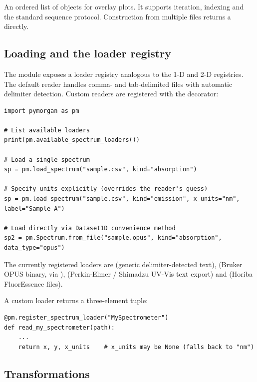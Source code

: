\subsubsection{}

An ordered list of  objects for overlay plots. It supports
iteration, indexing and the standard sequence protocol. Construction from
multiple files returns a  directly.

\subsection{Loading and the loader registry}

The module exposes a loader registry analogous to the 1-D and 2-D registries.
The default  reader handles comma- and tab-delimited files with
automatic delimiter detection. Custom readers are registered with the
 decorator:\

\begin{lstlisting}
import pymorgan as pm

# List available loaders
print(pm.available_spectrum_loaders())

# Load a single spectrum
sp = pm.load_spectrum("sample.csv", kind="absorption")

# Specify units explicitly (overrides the reader's guess)
sp = pm.load_spectrum("sample.csv", kind="emission", x_units="nm", label="Sample A")

# Load directly via Dataset1D convenience method
sp2 = pm.Spectrum.from_file("sample.opus", kind="absorption", data_type="opus")
\end{lstlisting}

The currently registered loaders are  (generic delimiter-detected
text),  (Bruker OPUS binary, via ), 
(Perkin-Elmer / Shimadzu UV-Vis text export) and  (Horiba
FluorEssence  files).

A custom loader returns a three-element tuple:
\begin{lstlisting}
@pm.register_spectrum_loader("MySpectrometer")
def read_my_spectrometer(path):
    ...
    return x, y, x_units    # x_units may be None (falls back to "nm")
\end{lstlisting}

\subsection{Transformations}

